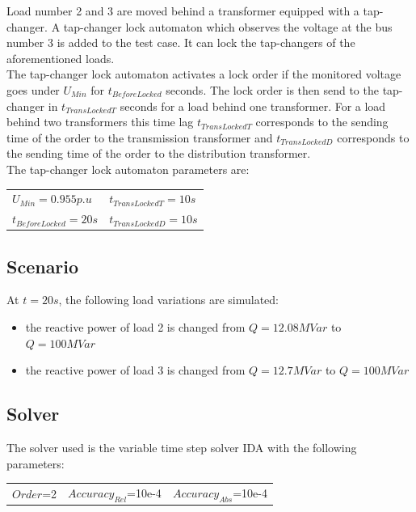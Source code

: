 \documentclass[a4paper, 12pt]{report}
\begin{document}
Load number 2 and 3 are moved behind a transformer equipped with a tap-changer. A tap-changer lock automaton which observes the voltage at the bus number 3 is added to the test case. It can lock the tap-changers of the aforementioned loads. \\

The tap-changer lock automaton activates a lock order if the monitored voltage goes under $U_{Min}$ for $t_{BeforeLocked}$ seconds. The lock order is then send to the tap-changer in $t_{TransLockedT}$ seconds for a load behind one transformer. For a load behind two transformers this time lag $t_{TransLockedT}$ corresponds to the sending time of the order to the transmission transformer and $t_{TransLockedD}$ corresponds to the sending time of the order to the distribution transformer. \\

The tap-changer lock automaton parameters are:
\begin{center}
\begin{tabular}{l|l}
   $U_{Min}=0.955p.u$ & $t_{TransLockedT}=10s$ \\
   $t_{BeforeLocked}=20s$  & $t_{TransLockedD}=10s$ \\
\end{tabular}
\end{center}

\subsection{Scenario}
At $t=20s$, the following load variations are simulated:
\begin{itemize}
\item{the reactive power of load 2 is changed from $Q=12.08MVar$ to $Q=100MVar$}
\item{the reactive power of load 3 is changed from $Q=12.7MVar$ to $Q=100MVar$}
\end{itemize}

\subsection{Solver}
The solver used is the variable time step solver IDA with the following parameters:
\begin{center}
\begin{tabular}{l|l|l}
   $Order$=2 & $Accuracy_{Rel}$=10e-4 & $Accuracy_{Abs}$=10e-4 \\
\end{tabular}
\end{center}
\end{document}
